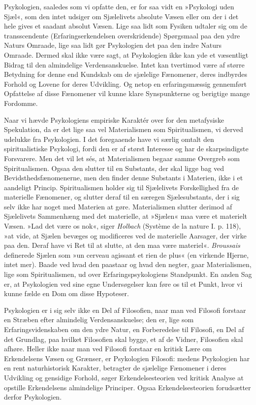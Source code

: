 \documentclass[12pt,a4paper,openany]{book}
\newcommand{\opage}[1]{\marginnote{\footnotesize\textit{[#1]}}}
\begin{document}
Psykologien, saaledes som vi opfatte den, er for saa vidt en »Psykologi
uden Sjæl«, som den intet udsiger om Sjælelivets absolute Væsen eller om
der i det hele gives et saadant absolut Væsen. Lige saa lidt som Fysiken
udtaler sig om de transscendente (Erfaringserkendelsen overskridende)
Spørgsmaal paa den ydre Naturs Omraade, lige saa lidt gør Psykologien
det paa den indre Naturs Omraade. Dermed skal ikke være sagt, at
Psykologien ikke kan yde et væsentligt Bidrag til den
\opage{17}almindelige Verdensanskuelse. Intet kan tvertimod være af
større Betydning for denne end Kundskab om de sjælelige Fænomener, deres
indbyrdes Forhold og Lovene for deres Udvikling. Og netop en
erfaringsmæssig gennemført Opfattelse af disse Fænomener vil kunne klare
Synspunkterne og berigtige mange Fordomme.

Naar vi hævde Psykologiens empiriske Karaktér over for den metafysiske
Spekulation, da er det lige saa vel Materialismen som Spiritualismen, vi
derved udelukke fra Psykologien. I det foregaaende have vi særlig omtalt
den spiritualistiske Psykologi, fordi den er af størst Interesse og har
de skarpsindigste Forsvarere. Men det vil let sés, at Materialismen
begaar samme Overgreb som Spiritualismen. Ogsaa den slutter til en
Substants, der skal ligge bag ved Bevidsthedsfænomenerne, men den finder
denne Substants i Materien, ikke i et aandeligt Princip. Spiritualismen
holder sig til Sjælelivets Forskellighed fra de materielle Fænomener, og
slutter deraf til en særegen Sjælesubstants, der i sig selv ikke har
noget med Materien at gøre. Materialismen slutter derimod af Sjælelivets
Sammenhæng med det materielle, at »Sjælen« maa være et materielt Væsen.
»Lad det være os nok«, siger \emph{Holbach} (Système de la nature I. p.
118), »at vide, at Sjælen bevæges og modificeres ved de materielle
Aarsager, der virke paa den. Deraf have vi Ret til at slutte, at den maa
være materiel«. \emph{Broussais} definerede Sjælen som »un cerveau
agissant et rien de plus« (en virkende Hjerne, intet mer). Baade ved
hvad den paastaar og hvad den negter, gaar Materialismen, lige som
Spiritualismen, ud over Erfaringspsykologiens Standpunkt. En anden Sag
er, at Psykologien ved sine egne Undersøgelser kan føre os til et Punkt,
hvor vi kunne fælde en Dom om disse Hypoteser.

Psykologien er i sig selv ikke en Del af Filosofien, naar man ved
Filosofi forstaar en Stræben efter almindelig Verdensanskuelse; den er,
lige som Erfaringsvidenskaben om den ydre Natur, en Forberedelse til
Filosofi, en Del af det Grundlag, paa hvilket Filosofien skal bygge, et
af de Vidner, Filosofien skal afhøre. Heller ikke naar man ved Filosofi
forstaar en kritisk Lære om Erkendelsens Væsen og Grænser, er
Psykologien Filosofi: medens Psykologien har en rent naturhistorisk
Karakter, betragter de sjælelige Fænomener i deres Udvikling
\opage{18}og gensidige Forhold, søger Erkendelsesteorien ved kritisk
Analyse at opstille Erkendelsens almindelige Principer. Ogsaa
Erkendelsesteorien forudsætter derfor Psykologien.
\end{document}
